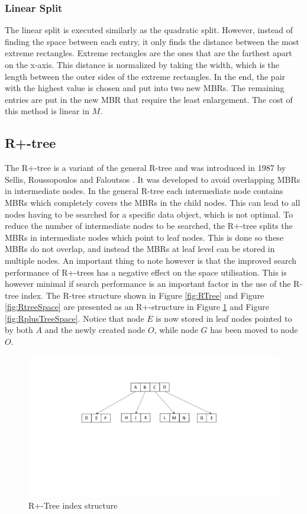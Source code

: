 \subsubsection{Linear Split}
The linear split is executed similarly as the quadratic split. However, instead of finding the space between each entry, it only finds the distance between the most extreme rectangles. Extreme rectangles are the ones that are the farthest apart on the x-axis. This distance is normalized by taking the width, which is the length between the outer sides of the extreme rectangles. In the end, the pair with the highest value is chosen and put into two new MBRs. The remaining entries are put in the new MBR that require the least enlargement. The cost of this method is linear in $M$. 

\subsection{R+-tree}
The R+-tree is a variant of the general R-tree and was introduced in 1987 by Sellis, Roussopoulos and Faloutsos \cite{R+Tree}. It was developed to avoid overlapping MBRs in intermediate nodes. In the general R-tree each intermediate node contains MBRs which completely covers the MBRs in the child nodes. This can lead to all nodes having to be searched for a specific data object, which is not optimal. To reduce the number of intermediate nodes to be searched, the R+-tree splits the MBRs in intermediate nodes which point to leaf nodes. This is done so these MBRs do not overlap, and instead the MBRs at leaf level can be stored in multiple nodes. An important thing to note however is that the improved search performance of R+-trees has a negative effect on the space utilisation. This is however minimal if search performance is an important factor in the use of the R-tree index. The R-tree structure shown in Figure \ref{fig:RTree} and Figure \ref{fig:RtreeSpace} are presented as an R+-structure in Figure \ref{fig:RplusTree} and Figure \ref{fig:RplusTreeSpace}. Notice that node $E$ is now stored in leaf nodes pointed to by both $A$ and the newly created node $O$, while node $G$ has been moved to node $O$. 

\begin{figure}[ht]
    \centering
    \includegraphics[scale=0.4]{figures/RPlusTree.pdf}
    \caption{R+-Tree index structure}
    \label{fig:RplusTree}
\end{figure}

